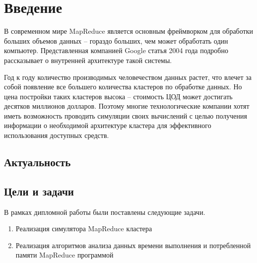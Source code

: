\documentclass[../diploma.tex]{subfile}
\begin{document}
    \section{Введение}\label{sec:introduction}

    В современном мире MapReduce является основным фреймворком для обработки
    больших объемов данных -- гораздо больших, чем может обработать один
    компьютер. Представленная компанией Google статья \cite{google_mapreduce}
    2004 года подробно рассказывает о внутренней архитектуре такой системы. 

    Год к году количество производимых человечеством данных растет, что влечет
    за собой появление все большего количества кластеров по обработке данных. Но
    цена постройки таких кластеров высока -- стоимость ЦОД может достигать
    десятков миллионов долларов. Поэтому многие технологические компании хотят
    иметь возможность проводить симуляции своих вычислений с целью получения
    информации о необходимой архитектуре кластера для эффективного использования
    доступных средств.

    \subsection{Актуальность}\label{subsec:relevance}

    \subsection{Цели и задачи}\label{subsec:goals}

    В рамках дипломной работы были поставлены следующие задачи.

    \begin{enumerate}
        \item Реализация симулятора MapReduce кластера
        \item Реализация алгоритмов анализа данных времени выполнения и
        потребленной памяти MapReduce программой
    \end{enumerate}
\end{document}

